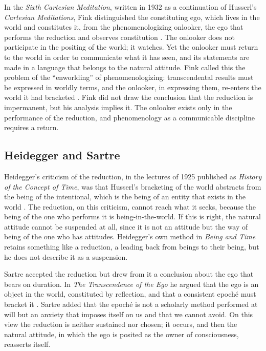 \documentclass{situationist-preprint}
\begin{document}
In the \emph{Sixth Cartesian Meditation}, written in 1932 as a continuation of Husserl's \emph{Cartesian Meditations}, Fink distinguished the constituting ego, which lives in the world and constitutes it, from the phenomenologizing onlooker, the ego that performs the reduction and observes constitution \citep{Fink1995}. The onlooker does not participate in the positing of the world; it watches. Yet the onlooker must return to the world in order to communicate what it has seen, and its statements are made in a language that belongs to the natural attitude. Fink called this the problem of the \enquote{enworlding} of phenomenologizing: transcendental results must be expressed in worldly terms, and the onlooker, in expressing them, re-enters the world it had bracketed \citep{Bruzina2004}. Fink did not draw the conclusion that the reduction is impermanent, but his analysis implies it. The onlooker exists only in the performance of the reduction, and phenomenology as a communicable discipline requires a return.

\subsection{Heidegger and Sartre}

Heidegger's criticism of the reduction, in the lectures of 1925 published as \emph{History of the Concept of Time}, was that Husserl's bracketing of the world abstracts from the being of the intentional, which is the being of an entity that exists in the world \citep{Heidegger1979}. The reduction, on this criticism, cannot reach what it seeks, because the being of the one who performs it is being-in-the-world. If this is right, the natural attitude cannot be suspended at all, since it is not an attitude but the way of being of the one who has attitudes. Heidegger's own method in \emph{Being and Time} retains something like a reduction, a leading back from beings to their being, but he does not describe it as a suspension.

Sartre accepted the reduction but drew from it a conclusion about the ego that bears on duration. In \emph{The Transcendence of the Ego} he argued that the ego is an object in the world, constituted by reflection, and that a consistent epoché must bracket it \citep{Sartre1936}. Sartre added that the epoché is not a scholarly method performed at will but an anxiety that imposes itself on us and that we cannot avoid. On this view the reduction is neither sustained nor chosen; it occurs, and then the natural attitude, in which the ego is posited as the owner of consciousness, reasserts itself.
\end{document}
